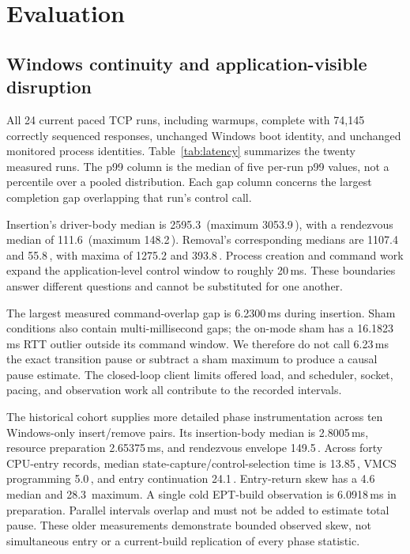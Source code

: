 \section{Evaluation}
\label{sec:evaluation}
\subsection{Windows continuity and application-visible disruption}
All 24 current paced TCP runs, including warmups, complete with 74,145 correctly
sequenced responses, unchanged Windows boot identity, and unchanged monitored
process identities. Table~\ref{tab:latency} summarizes the twenty measured runs.
The p99 column is the median of five per-run p99 values, not a percentile over
a pooled distribution. Each gap column concerns the largest completion gap
overlapping that run's control call.

\begin{table}[tbp]
\centering\small
\caption{Current paced TCP experiment, five measured runs per condition. Gap
columns summarize command-overlapping completion gaps. The call column is the
median application-level control-call duration.}
\label{tab:latency}

\end{table}

Insertion's driver-body median is 2595.3\,\us{} (maximum 3053.9\,\us{}), with a
rendezvous median of 111.6\,\us{} (maximum 148.2\,\us{}). Removal's corresponding
medians are 1107.4 and 55.8\,\us{}, with maxima of 1275.2 and 393.8\,\us{}.
Process creation and command work expand the application-level control window
to roughly 20\,ms. These boundaries answer different questions and cannot be
substituted for one another.

The largest measured command-overlap gap is 6.2300\,ms during insertion. Sham
conditions also contain multi-millisecond gaps; the on-mode sham has a
16.1823\,ms RTT outlier outside its command window. We therefore do not call
6.23\,ms the exact transition pause or subtract a sham maximum to produce a
causal pause estimate. The closed-loop client limits offered load, and scheduler,
socket, pacing, and observation work all contribute to the recorded intervals.

The historical cohort supplies more detailed phase instrumentation across ten
Windows-only insert/remove pairs. Its insertion-body median is 2.8005\,ms,
resource preparation 2.65375\,ms, and rendezvous envelope 149.5\,\us{}. Across
forty CPU-entry records, median state-capture/control-selection time is
13.85\,\us{}, VMCS programming 5.0\,\us{}, and entry continuation 24.1\,\us{}.
Entry-return skew has a 4.6\,\us{} median and 28.3\,\us{} maximum. A single cold
EPT-build observation is 6.0918\,ms in preparation. Parallel intervals overlap
and must not be added to estimate total pause. These older measurements
demonstrate bounded observed skew, not simultaneous entry or a current-build
replication of every phase statistic.

